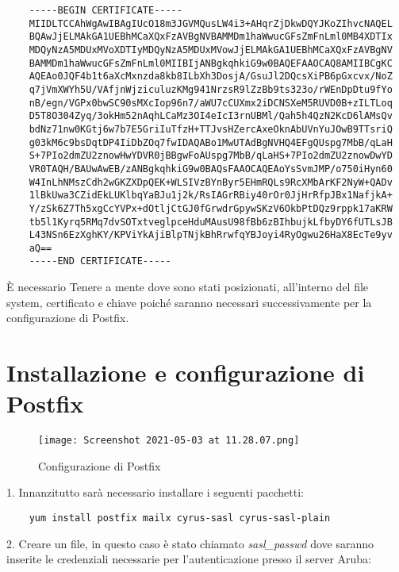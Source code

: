 \begin{verbatim}
    -----BEGIN CERTIFICATE-----
    MIIDLTCCAhWgAwIBAgIUcO18m3JGVMQusLW4i3+AHqrZjDkwDQYJKoZIhvcNAQEL
    BQAwJjELMAkGA1UEBhMCaXQxFzAVBgNVBAMMDm1haWwucGFsZmFnLml0MB4XDTIx
    MDQyNzA5MDUxMVoXDTIyMDQyNzA5MDUxMVowJjELMAkGA1UEBhMCaXQxFzAVBgNV
    BAMMDm1haWwucGFsZmFnLml0MIIBIjANBgkqhkiG9w0BAQEFAAOCAQ8AMIIBCgKC
    AQEAo0JQF4b1t6aXcMxnzda8kb8ILbXh3DosjA/GsuJl2DQcsXiPB6pGxcvx/NoZ
    q7jVmXWYh5U/VAfjnWjziculuzKMg941NrzsR9lZzBb9ts323o/rWEnDpDtu9fYo
    nB/egn/VGPx0bwSC90sMXcIop96n7/aWU7cCUXmx2iDCNSXeM5RUVD0B+zILTLoq
    D5T8O304Zyq/3okHm52nAqhLCaMz3OI4eIcI3rnUBMl/Qah5h4QzN2KcD6lAMsQv
    bdNz71nw0KGtj6w7b7E5GriIuTfzH+TTJvsHZercAxeOknAbUVnYuJOwB9TTsriQ
    g03kM6c9bsDqtDP4IiDbZOq7fwIDAQABo1MwUTAdBgNVHQ4EFgQUspg7MbB/qLaH
    S+7PIo2dmZU2znowHwYDVR0jBBgwFoAUspg7MbB/qLaHS+7PIo2dmZU2znowDwYD
    VR0TAQH/BAUwAwEB/zANBgkqhkiG9w0BAQsFAAOCAQEAoYsSvmJMP/o750iHyn60
    W4InLhNMszCdh2wGKZXDpQEK+WLSIVzBYnByr5EHmRQLs9RcXMbArKF2NyW+QADv
    1lBkUwa3CZidEkLUKlbqYaBJu1j2k/RsIAGrRBiy40rOr0JjHrRfpJBx1NafjkA+
    Y/zSk6Z7Th5xgCcYVPx+dOtljCtGJ0fGrwdrGpywSKzV6OkbPtDQz9rppk17aKRW
    tb5l1Kyrq5RMq7dvSOTxtveglpceHduMAusU98fBb6zBIhbujkLfbyDY6fUTLsJB
    L43NSn6EzXghKY/KPViYkAjiBlpTNjkBhRrwfqYBJoyi4RyOgwu26HaX8EcTe9yv
    aQ==
    -----END CERTIFICATE-----

\end{verbatim}

È necessario Tenere a mente dove sono stati posizionati, all’interno del file system, 
certificato e chiave poiché saranno necessari successivamente per la configurazione di Postfix.

\section{Installazione e configurazione di Postfix}

\begin{figure}[htp]
    \centering
    \texttt{[image: Screenshot 2021-05-03 at 11.28.07.png]}
    \caption{Configurazione di Postfix}\label{confPostfix}
  \end{figure}

1. Innanzitutto sarà necessario installare i seguenti pacchetti:

\begin{verbatim}
    yum install postfix mailx cyrus-sasl cyrus-sasl-plain
\end{verbatim}
2. Creare un file, in questo caso è stato chiamato \textit{sasl\_passwd} dove saranno inserite le credenziali
necessarie per l'autenticazione presso il server Aruba:

